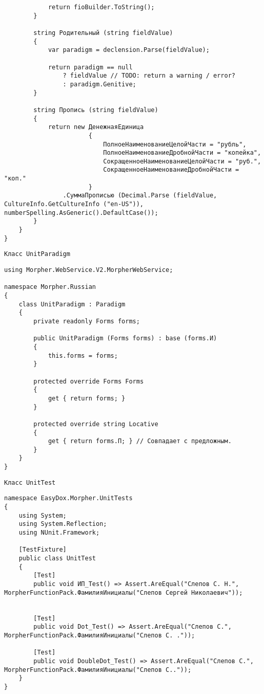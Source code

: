 \begin{lstlisting}
            return fioBuilder.ToString();
        }

        string Родительный (string fieldValue)
        {
            var paradigm = declension.Parse(fieldValue);

            return paradigm == null 
                ? fieldValue // TODO: return a warning / error?
                : paradigm.Genitive; 
        }

        string Пропись (string fieldValue)
        {
            return new ДенежнаяЕдиница 
                       {
                           ПолноеНаименованиеЦелойЧасти = "рубль",
                           ПолноеНаименованиеДробнойЧасти = "копейка",
                           СокращенноеНаименованиеЦелойЧасти = "руб.",
                           СокращенноеНаименованиеДробнойЧасти = "коп."
                       }
                .СуммаПрописью (Decimal.Parse (fieldValue, CultureInfo.GetCultureInfo ("en-US")), numberSpelling.AsGeneric().DefaultCase());
        }
    }
}
\end{lstlisting}

\begin{verbatim}
Класс UnitParadigm
\end{verbatim}

\begin{lstlisting}
using Morpher.WebService.V2.MorpherWebService;

namespace Morpher.Russian
{
    class UnitParadigm : Paradigm
    {
        private readonly Forms forms;

        public UnitParadigm (Forms forms) : base (forms.И)
        {
            this.forms = forms;
        }

        protected override Forms Forms
        {
            get { return forms; }
        }

        protected override string Locative
        {
            get { return forms.П; } // Совпадает с предложным.
        }
    }
}
\end{lstlisting}

\begin{verbatim}
Класс UnitTest
\end{verbatim}

\begin{lstlisting}
namespace EasyDox.Morpher.UnitTests
{
    using System;
    using System.Reflection;
    using NUnit.Framework;

    [TestFixture]
    public class UnitTest
    {
        [Test]
        public void ИП_Test() => Assert.AreEqual("Слепов С. Н.", MorpherFunctionPack.ФамилияИнициалы("Слепов Сергей Николаевич"));


        [Test]
        public void Dot_Test() => Assert.AreEqual("Слепов С.", MorpherFunctionPack.ФамилияИнициалы("Слепов С. ."));

        [Test]
        public void DoubleDot_Test() => Assert.AreEqual("Слепов С.", MorpherFunctionPack.ФамилияИнициалы("Слепов С.."));
    }
}
\end{lstlisting}